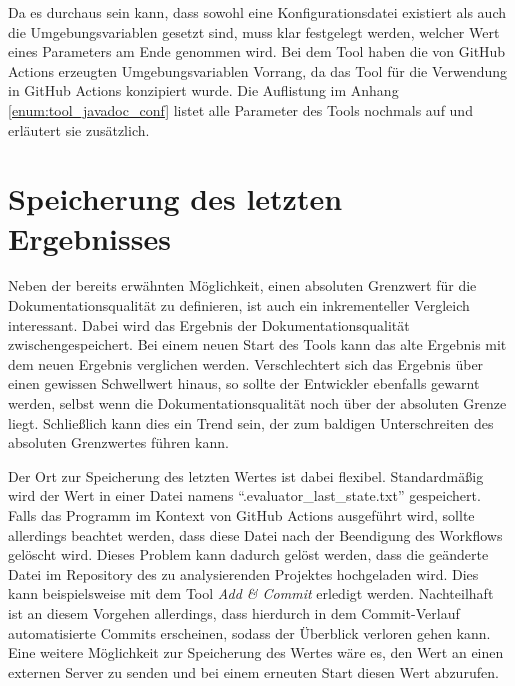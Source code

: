 Da es durchaus sein kann, dass sowohl eine Konfigurationsdatei existiert als auch die Umgebungsvariablen gesetzt sind, muss klar festgelegt werden, welcher Wert eines Parameters am Ende genommen wird. Bei dem Tool haben die von GitHub Actions erzeugten Umgebungsvariablen  Vorrang, da das Tool für die Verwendung in GitHub Actions konzipiert wurde.  Die Auflistung im Anhang \ref{enum:tool_javadoc_conf} listet alle Parameter des Tools nochmals auf und erläutert sie zusätzlich. 

\begin{comment}
Das Tool \textit{create\_conf}, das im Hauptverzeichnis im GitHub-Repository liegt kann eine beispielhafte Konfigurationsdatei erstellen, indem \textit{node create\_conf.js --out PATH --type json} aufgerufen wird. Dabei ist \textit{PATH} ein Pfad ohne Dateiname. Dieses Hilfstool legt dann eine Konfigurationsdatei namens \enquote{comment\_conf.json} in dem angegebenen Verzeichnis an. 
\end{comment}
\section{Speicherung des letzten Ergebnisses}\label{chapter:saving}
Neben der bereits erwähnten Möglichkeit, einen absoluten Grenzwert für die Dokumentationsqualität zu definieren, ist auch ein inkrementeller Vergleich interessant. Dabei wird das Ergebnis der Dokumentationsqualität zwischengespeichert. Bei einem neuen Start des Tools kann das alte Ergebnis mit dem neuen Ergebnis verglichen werden. Verschlechtert sich das Ergebnis über einen gewissen Schwellwert hinaus, so sollte der Entwickler ebenfalls gewarnt werden, selbst wenn die Dokumentationsqualität noch über der absoluten Grenze liegt. Schließlich kann dies ein Trend sein, der zum baldigen Unterschreiten des absoluten Grenzwertes führen kann. 

Der Ort zur Speicherung des letzten Wertes ist dabei flexibel. Standardmäßig wird der Wert in einer Datei namens \enquote{.evaluator\_last\_state.txt} gespeichert. Falls das Programm im Kontext von GitHub Actions ausgeführt wird, sollte allerdings beachtet werden, dass diese Datei nach der Beendigung des Workflows gelöscht wird. Dieses Problem kann dadurch gelöst werden, dass die geänderte Datei im Repository des zu analysierenden Projektes hochgeladen wird. Dies kann beispielsweise mit dem Tool \textit{Add \& Commit} \cite{add_commit} erledigt werden. Nachteilhaft ist an diesem Vorgehen allerdings, dass hierdurch in dem Commit-Verlauf automatisierte Commits erscheinen, sodass der Überblick verloren gehen kann.  Eine weitere Möglichkeit zur Speicherung des Wertes wäre es, den Wert an einen externen Server zu senden und bei einem erneuten Start diesen Wert abzurufen. 

